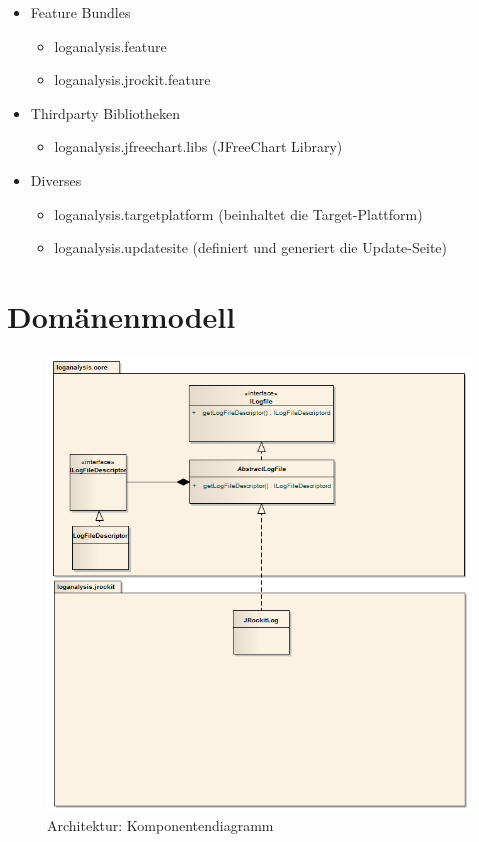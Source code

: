 \begin{itemize}
	\item Feature Bundles
		\begin{itemize}
			\item loganalysis.feature
			\item loganalysis.jrockit.feature
		\end{itemize}
	\item Thirdparty Bibliotheken
		\begin{itemize}
			\item  loganalysis.jfreechart.libs (JFreeChart Library)
		\end{itemize}
	\item Diverses
		\begin{itemize}
			\item  loganalysis.targetplatform (beinhaltet die Target-Plattform)
			\item loganalysis.updatesite (definiert und generiert die Update-Seite)
		\end{itemize}
\end{itemize}

\section{Domänenmodell}
 \begin{figure}[H]
  	\centering
        	\caption{Architektur: Komponentendiagramm}
    	\includegraphics[width=15.5cm]{images/domainmodel_basic}
\end{figure}
